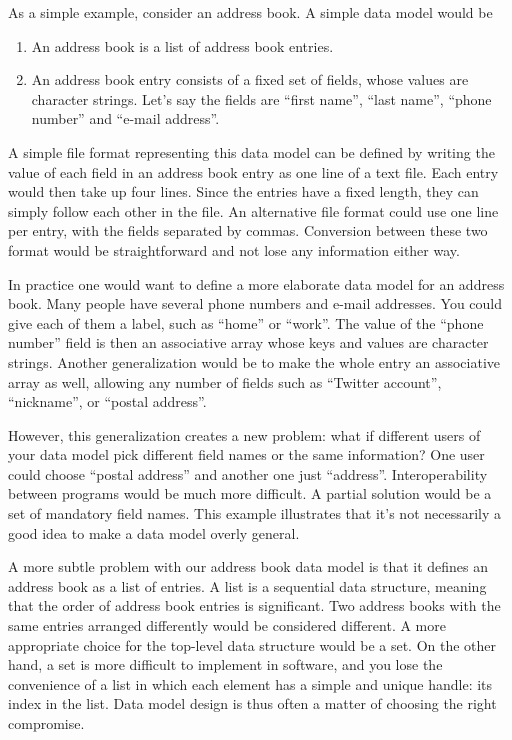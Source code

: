 \documentclass{csmagazine}
\begin{document}
As a simple example, consider an address book. A simple data model would be
\begin{enumerate}
\item An address book is a list of address book entries.
\item An address book entry consists of a fixed set of fields, whose values
      are character strings. Let's say the fields are ``first name'', ``last name'', ``phone number'' and ``e-mail address''.
\end{enumerate}

A simple file format representing this data model can be defined by writing the value of each field in an address book entry as one line of a text file. Each entry would then take up four lines. Since the entries have a fixed length, they can simply follow each other in the file. An alternative file format could use one line per entry, with the fields separated by commas. Conversion between these two format would be straightforward and not lose any information either way.

In practice one would want to define a more elaborate data model for an address book. Many people have several phone numbers and e-mail addresses. You could give each of them a label, such as ``home'' or ``work''. The value of the ``phone number'' field is then an associative array whose keys and values are character strings. Another generalization would be to make the whole entry an associative array as well, allowing any number of fields such as ``Twitter account'', ``nickname'', or ``postal address''.

However, this generalization creates a new problem: what if different users of your data model pick different field names or the same information? One user could choose ``postal address'' and another one just ``address''. Interoperability between programs would be much more difficult. A partial solution would be a set of mandatory field names. This example illustrates that it's not necessarily a good idea to make a data model overly general.

A more subtle problem with our address book data model is that it defines an address book as a list of entries. A list is a sequential data structure, meaning that the order of address book entries is significant. Two address books with the same entries arranged differently would be considered different. A more appropriate choice for the top-level data structure would be a set. On the other hand, a set is more difficult to implement in software, and you lose the convenience of a list in which each element has a simple and unique handle: its index in the list. Data model design is thus often a matter of choosing the right compromise.
\end{document}
